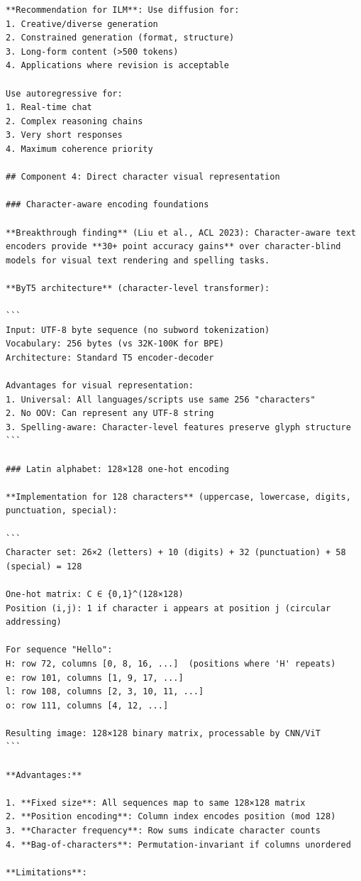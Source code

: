 \documentclass[11pt]{article}
\begin{document}
\begin{verbatim}
**Recommendation for ILM**: Use diffusion for:
1. Creative/diverse generation
2. Constrained generation (format, structure)
3. Long-form content (>500 tokens)
4. Applications where revision is acceptable

Use autoregressive for:
1. Real-time chat
2. Complex reasoning chains
3. Very short responses
4. Maximum coherence priority

## Component 4: Direct character visual representation

### Character-aware encoding foundations

**Breakthrough finding** (Liu et al., ACL 2023): Character-aware text encoders provide **30+ point accuracy gains** over character-blind models for visual text rendering and spelling tasks.

**ByT5 architecture** (character-level transformer):

```
Input: UTF-8 byte sequence (no subword tokenization)
Vocabulary: 256 bytes (vs 32K-100K for BPE)
Architecture: Standard T5 encoder-decoder

Advantages for visual representation:
1. Universal: All languages/scripts use same 256 "characters"
2. No OOV: Can represent any UTF-8 string
3. Spelling-aware: Character-level features preserve glyph structure
```

### Latin alphabet: 128×128 one-hot encoding

**Implementation for 128 characters** (uppercase, lowercase, digits, punctuation, special):

```
Character set: 26×2 (letters) + 10 (digits) + 32 (punctuation) + 58 (special) = 128

One-hot matrix: C ∈ {0,1}^(128×128)
Position (i,j): 1 if character i appears at position j (circular addressing)

For sequence "Hello":
H: row 72, columns [0, 8, 16, ...]  (positions where 'H' repeats)
e: row 101, columns [1, 9, 17, ...]
l: row 108, columns [2, 3, 10, 11, ...]
o: row 111, columns [4, 12, ...]

Resulting image: 128×128 binary matrix, processable by CNN/ViT
```

**Advantages:**

1. **Fixed size**: All sequences map to same 128×128 matrix
2. **Position encoding**: Column index encodes position (mod 128)
3. **Character frequency**: Row sums indicate character counts
4. **Bag-of-characters**: Permutation-invariant if columns unordered

**Limitations**: 


\end{verbatim}
\end{document}
